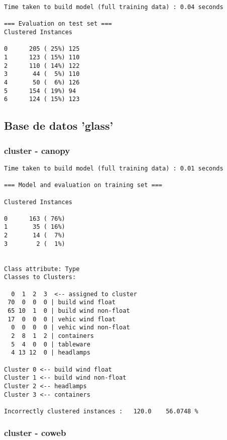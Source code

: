 \documentclass[a4paper]{article}
\begin{document}
\begin{verbatim}
Time taken to build model (full training data) : 0.04 seconds

=== Evaluation on test set ===
Clustered Instances

0      205 ( 25%) 125
1      123 ( 15%) 110
2      110 ( 14%) 122
3       44 (  5%) 110
4       50 (  6%) 126
5      154 ( 19%) 94
6      124 ( 15%) 123

\end{verbatim}

\subsection{Base de datos 'glass'}

\subsubsection{cluster - canopy}

\begin{verbatim}
Time taken to build model (full training data) : 0.01 seconds

=== Model and evaluation on training set ===

Clustered Instances

0      163 ( 76%)
1       35 ( 16%)
2       14 (  7%)
3        2 (  1%)


Class attribute: Type
Classes to Clusters:

  0  1  2  3  <-- assigned to cluster
 70  0  0  0 | build wind float
 65 10  1  0 | build wind non-float
 17  0  0  0 | vehic wind float
  0  0  0  0 | vehic wind non-float
  2  8  1  2 | containers
  5  4  0  0 | tableware
  4 13 12  0 | headlamps

Cluster 0 <-- build wind float
Cluster 1 <-- build wind non-float
Cluster 2 <-- headlamps
Cluster 3 <-- containers

Incorrectly clustered instances :	120.0	 56.0748 %
\end{verbatim}

\subsubsection{cluster - coweb}
\end{document}
